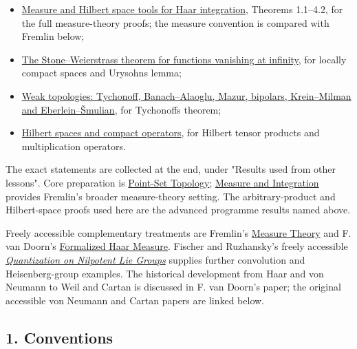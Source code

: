 \documentclass[
  english,
  11pt,
  a4paper,
]{article}
\providecommand{\tightlist}{%
  \setlength{\itemsep}{0pt}\setlength{\parskip}{0pt}}
\begin{document}
\begin{itemize}
\tightlist
\item
  \hyperref[measure-and-hilbert-space-tools]{Measure and Hilbert space
  tools for Haar integration}, Theorems 1.1--4.2, for the full
  measure-theory proofs; the measure convention is compared with Fremlin
  below;
\item
  \hyperref[the-stone-weierstrass-theorem-for-functions-vanishing-at-infinity]{The
  Stone--Weierstrass theorem for functions vanishing at infinity}, for
  locally compact spaces and Urysohn\textquotesingle s lemma;
\item
  \hyperref[weak-topologies-tychonoff-banach-alaoglu-mazur-bipolars-krein-milman-and-eberlein-smulian]{Weak
  topologies: Tychonoff, Banach--Alaoglu, Mazur, bipolars, Krein--Milman
  and Eberlein--Šmulian}, for Tychonoff\textquotesingle s theorem;
\item
  \hyperref[hilbert-spaces-and-compact-operators]{Hilbert spaces and
  compact operators}, for Hilbert tensor products and multiplication
  operators.
\end{itemize}

The exact statements are collected at the end, under "Results used from
other lessons". Core preparation is
\href{https://kokunoyumeto.github.io/program-matematika-indonesia/en/\#course-C90}{Point-Set
Topology};
\href{https://kokunoyumeto.github.io/program-matematika-indonesia/en/\#course-D10}{Measure
and Integration} provides Fremlin's broader measure-theory setting. The
arbitrary-product and Hilbert-space proofs used here are the advanced
programme results named above.

Freely accessible complementary treatments are Fremlin's
\href{https://www1.essex.ac.uk/maths/people/fremlin/mtcont.htm}{Measure
Theory} and F. van Doorn's
\href{https://arxiv.org/abs/2102.07636v1}{Formalized Haar Measure}.
Fischer and Ruzhansky's freely accessible
\href{https://biblio.ugent.be/publication/8585474}{\emph{Quantization on
Nilpotent Lie Groups}} supplies further convolution and Heisenberg-group
examples. The historical development from Haar and von Neumann to Weil
and Cartan is discussed in F. van Doorn's paper; the original accessible
von Neumann and Cartan papers are linked below.

\subsection{1.
Conventions}\label{haar-measure-on-locally-compact-groups--1-conventions}
\end{document}
